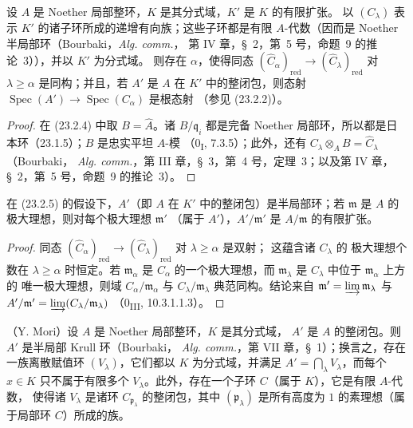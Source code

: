 \begin{corollary}[23.2.5]
\label{0.23.2.5-fr}
设 $A$ 是 Noether 局部整环，$K$ 是其分式域，$K'$ 是 $K$ 的有限扩张。
以 $(C_\lambda)$ 表示 $K'$ 的诸子环所成的递增有向族；这些子环都是有限
$A$-代数（因而是 Noether 半局部环（Bourbaki，\emph{Alg. comm.}，
第 IV 章，§~2，第~5 号，命题~9 的推论~3）），并以 $K'$ 为分式域。
则存在 $\alpha$，使得同态
$(\widehat C_\alpha)_{\mathrm{red}}\to
(\widehat C_\lambda)_{\mathrm{red}}$ 对 $\lambda\geqslant\alpha$ 是同构；并且，若 $A'$ 是 $A$ 在
$K'$ 中的整闭包，则态射
$\operatorname{Spec}(A')\to\operatorname{Spec}(C_\alpha)$ 是根态射
（参见 (23.2.2)）。
\end{corollary}


\begin{proof}
在 (23.2.4) 中取 $B=\widehat A$。诸 $B/\mathfrak q_i$ 都是完备 Noether
局部环，所以都是日本环（23.1.5）；$B$ 是忠实平坦 $A$-模
（0\textsubscript{I}, 7.3.5）；此外，还有
$C_\lambda\otimes_AB=\widehat C_\lambda$（Bourbaki，
\emph{Alg. comm.}，第 III 章，§~3，第~4 号，定理~3；以及第 IV 章，
§~2，第~5 号，命题~9 的推论~3）。
\end{proof}

\begin{corollary}[23.2.6]
\label{0.23.2.6-fr}
在 (23.2.5) 的假设下，$A'$（即 $A$ 在 $K'$ 中的整闭包）是半局部环；若
$\mathfrak m$ 是 $A$ 的极大理想，则对每个极大理想 $\mathfrak m'$
（属于 $A'$），$A'/\mathfrak m'$ 是 $A/\mathfrak m$ 的有限扩张。
\end{corollary}

\begin{proof}
同态 $(\widehat C_\alpha)_{\mathrm{red}}\to
(\widehat C_\lambda)_{\mathrm{red}}$ 对 $\lambda\geqslant\alpha$ 是双射；
这蕴含诸 $C_\lambda$ 的
极大理想个数在 $\lambda\geqslant\alpha$ 时恒定。若
$\mathfrak m_\alpha$ 是 $C_\alpha$ 的一个极大理想，而
$\mathfrak m_\lambda$ 是 $C_\lambda$ 中位于 $\mathfrak m_\alpha$ 上方的
唯一极大理想，则域 $C_\alpha/\mathfrak m_\alpha$ 与
$C_\lambda/\mathfrak m_\lambda$ 典范同构。结论来自
$\mathfrak m'=\varinjlim\mathfrak m_\lambda$ 与
$A'/\mathfrak m'=\varinjlim(C_\lambda/\mathfrak m_\lambda)$
（0\textsubscript{III}, 10.3.1.1.3）。
\end{proof}

\begin{proposition}[23.2.7]
\label{0.23.2.7-fr}
\textnormal{（Y. Mori）}设 $A$ 是 Noether 局部整环，$K$ 是其分式域，
$A'$ 是 $A$ 的整闭包。则 $A'$ 是半局部 Krull 环（Bourbaki，
\emph{Alg. comm.}，第 VII 章，§~1）；换言之，存在一族离散赋值环
$(V_\lambda)$，它们都以 $K$ 为分式域，并满足
$A'=\bigcap_\lambda V_\lambda$，而每个 $x\in K$ 只不属于有限多个
$V_\lambda$。此外，存在一个子环 $C$（属于 $K$），它是有限 $A$-代数，
使得诸 $V_\lambda$ 是诸环 $C_{\mathfrak p_\lambda}$ 的整闭包，其中
$(\mathfrak p_\lambda)$ 是所有高度为 $1$ 的素理想（属于局部环 $C$）所成的族。
\end{proposition}

